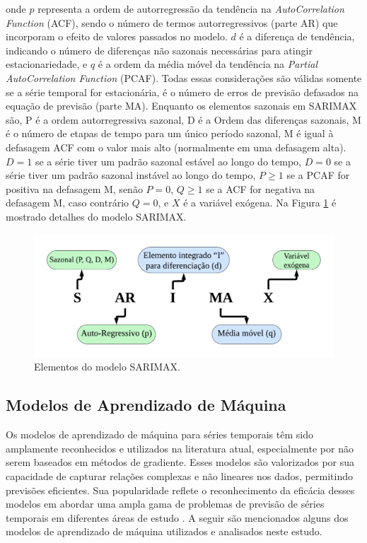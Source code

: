  \noindent onde $p$ representa a ordem de autorregressão da tendência na \textit{AutoCorrelation Function} (ACF), sendo o número de termos autorregressivos (parte AR) que incorporam o efeito de valores passados no modelo. $d$ é a diferença de tendência, indicando o número de diferenças não sazonais necessárias para atingir estacionariedade, e $q$ é a ordem da média móvel da tendência na \textit{Partial AutoCorrelation Function} (PCAF). Todas essas considerações são válidas somente se a série temporal for estacionária, é o número de erros de previsão defasados na equação de previsão (parte MA). Enquanto os elementos sazonais em SARIMAX são, P é a ordem autorregressiva sazonal, D é a Ordem das diferenças sazonais,
 M é o número de etapas de tempo para um único período sazonal, M é igual à defasagem ACF com o valor mais alto (normalmente em uma defasagem alta). $D=1$ se a série tiver um padrão sazonal estável ao longo do tempo, $D=0$ se a série tiver um padrão sazonal instável ao longo do tempo, $P\geq1$ se a PCAF for positiva na defasagem M, senão $P=0$, $Q\geq1$ se a ACF for negativa na defasagem M, caso contrário $Q=0$, e $X$ é a variável exógena. Na Figura \ref{fig:sarimaxmap} é mostrado detalhes do modelo SARIMAX.
 

 
 \begin{figure}[H]
 	\centering
 	\caption{Elementos do modelo SARIMAX.}
 	\label{fig:sarimaxmap}
 	\includegraphics[width=\linewidth]{Modelos/Figuras/sarimax_map.pdf}
 	
 \end{figure}
 

 
 \subsection{Modelos de Aprendizado de M\'aquina}\label{subsec:reg}
 
 Os modelos de aprendizado de máquina para séries temporais têm sido amplamente reconhecidos e utilizados na literatura atual, especialmente por não serem baseados em métodos de gradiente. Esses modelos são valorizados por sua capacidade de capturar relações complexas e não lineares nos dados, permitindo previsões eficientes. Sua popularidade reflete o reconhecimento da eficácia desses modelos em abordar uma ampla gama de problemas de previsão de séries temporais em diferentes áreas de estudo \cite{al2021machine, sen2022machine, kheiri2023sentimentgpt}. A seguir são mencionados alguns dos modelos de aprendizado de máquina utilizados e analisados neste estudo.
 
